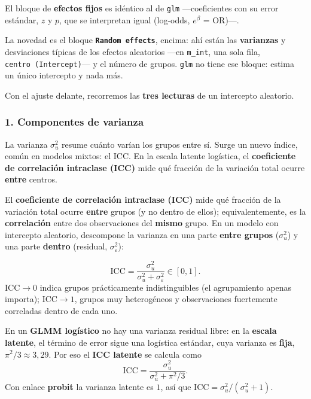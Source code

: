 \documentclass[
  letterpaper,
  DIV=11,
  numbers=noendperiod]{scrartcl}
\begin{document}
El bloque de \textbf{efectos fijos} es idéntico al de \texttt{glm}
---coeficientes con su error estándar, \(z\) y \(p\), que se interpretan
igual (log-odds, \(e^{\beta}\) = OR)---.

La novedad es el bloque \textbf{\texttt{Random\ effects}}, encima: ahí
están las \textbf{varianzas} y desviaciones típicas de los efectos
aleatorios ---en \texttt{m\_int}, una sola fila,
\texttt{centro\ (Intercept)}--- y el número de grupos. \texttt{glm} no
tiene ese bloque: estima un único intercepto y nada más.

Con el ajuste delante, recorremos las \textbf{tres lecturas} de un
intercepto aleatorio.

\hypertarget{componentes-de-varianza}{%
\subsubsection{1. Componentes de
varianza}\label{componentes-de-varianza}}

La varianza \(\sigma_u^2\) resume cuánto varían los grupos entre sí.
Surge un nuevo índice, común en modelos mixtos: el ICC. En la escala
latente logística, el \textbf{coeficiente de correlación intraclase
(ICC)} mide qué fracción de la variación total ocurre \textbf{entre}
centros.

El \textbf{coeficiente de correlación intraclase (ICC)} mide qué
fracción de la variación total ocurre \textbf{entre} grupos (y no dentro
de ellos); equivalentemente, es la \textbf{correlación} entre dos
observaciones del \textbf{mismo} grupo. En un modelo con intercepto
aleatorio, descompone la varianza en una parte \textbf{entre grupos}
(\(\sigma_u^2\)) y una parte \textbf{dentro} (residual,
\(\sigma_\varepsilon^2\)):

\[
\text{ICC}=\frac{\sigma_u^2}{\sigma_u^2+\sigma_\varepsilon^2}\in[0,1].
\] \(\text{ICC}\to 0\) indica grupos prácticamente indistinguibles (el
agrupamiento apenas importa); \(\text{ICC}\to 1\), grupos muy
heterogéneos y observaciones fuertemente correladas dentro de cada uno.

En un \textbf{GLMM logístico} no hay una varianza residual libre: en la
\textbf{escala latente}, el término de error sigue una logística
estándar, cuya varianza es \textbf{fija}, \(\pi^2/3\approx 3{,}29\). Por
eso el \textbf{ICC latente} se calcula como \[
\text{ICC}=\frac{\sigma_u^2}{\sigma_u^2+\pi^2/3}.
\] Con enlace \textbf{probit} la varianza latente es \(1\), así que
\(\text{ICC}=\sigma_u^2/(\sigma_u^2+1)\).
\end{document}
